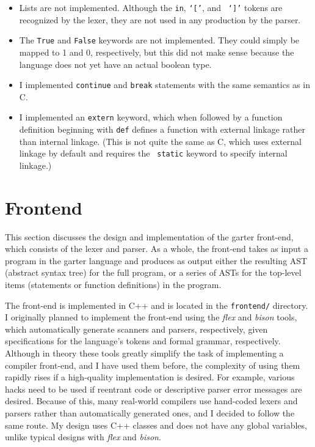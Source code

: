 \documentclass[11pt]{article}
\begin{document}
\begin{itemize}
    \item Lists are not implemented.  Although the {\tt in}, {\tt `['}, and {\tt
        `]'} tokens are recognized by the lexer, they are not used in any
        production by the parser.
    \item The {\tt True} and {\tt False} keywords are not implemented.  They
        could simply be mapped to 1 and 0, respectively, but this did not make
        sense because the language does not yet have an actual boolean type.
    \item I implemented {\tt continue} and {\tt break} statements with the same
        semantics as in C.
    \item I implemented an {\tt extern} keyword, which when followed by a
        function definition beginning with {\tt def} defines a function with
        external linkage rather than internal linkage.  (This is not quite the
        same as C, which uses external linkage by default and requires the {\tt
        static} keyword to specify internal linkage.)
\end{itemize}

\section{Frontend}

This section discusses the design and implementation of the garter front-end,
which consists of the lexer and parser.  As a whole, the front-end takes as input
a program in the garter language and produces as output either the resulting
AST (abstract syntax tree) for the full program, or a series of ASTs for the
top-level items (statements or function definitions) in the program.

The front-end is implemented in C++ and is located in the {\tt frontend/}
directory.  I originally planned to implement the front-end using the {\em flex}
and {\em bison} tools, which automatically generate scanners and parsers,
respectively, given specifications for the language's tokens and formal grammar,
respectively.  Although in theory these tools greatly simplify the task of
implementing a compiler front-end, and I have used them before, the complexity
of using them rapidly rises if a high-quality implementation is desired.  For
example, various hacks need to be used if reentrant code or descriptive parser
error messages are desired.  Because of this, many real-world compilers use
hand-coded lexers and parsers rather than automatically generated ones, and I
decided to follow the same route.  My design uses C++ classes and does not have
any global variables, unlike typical designs with {\em flex} and {\em bison}.
\end{document}
